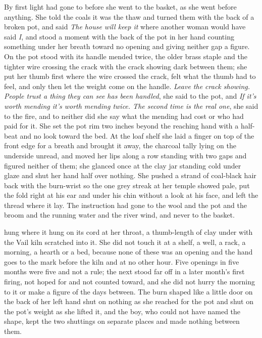 By first light  had gone to  before she went to the basket, as she went before anything. She told the coals it was the thaw and turned them with the back of a broken pot, and said \emph{The house will keep it} where another woman would have said \emph{I}, and stood a moment with the back of the pot in her hand counting something under her breath toward no opening and giving neither gap a figure. On  the pot stood with its handle mended twice, the older brass staple and the tighter wire crossing the crack with the crack showing dark between them; she put her thumb first where the wire crossed the crack, felt what the thumb had to feel, and only then let the weight come on the handle. \emph{Leave the crack showing. People trust a thing they can see has been handled}, she said to the pot, and \emph{If it's worth mending it's worth mending twice. The second time is the real one}, she said to the fire, and to neither did she say what the mending had cost or who had paid for it. She set the pot rim two inches beyond the reaching hand with a half-beat and no look toward the bed. At the loaf shelf she laid a finger on top of the front edge for a breath and brought it away, the charcoal tally lying on the underside unread, and moved her lips along a row standing with two gaps and figured neither of them; she glanced once at the clay jar standing cold under glaze and shut her hand half over nothing. She pushed a strand of coal-black hair back with the burn-wrist so the one grey streak at her temple showed pale, put the fold right at his ear and under his chin without a look at his face, and left the thread where it lay. The instruction had gone to the wool and the pot and the broom and the running water and the river wind, and never to the basket.

 hung where it hung on its cord at her throat, a thumb-length of clay under  with the Vail kiln scratched into it. She did not touch it at a shelf, a well, a rack, a morning, a hearth or a bed, because none of these was an opening and the hand goes to the mark before the kiln and at no other hour. Five openings in five months were five and not a rule; the next stood far off in a later month's first firing, not hoped for and not counted toward, and she did not hurry the morning to it or make a figure of the days between. The burn shaped like a little door on the back of her left hand shut on nothing as she reached for the pot and shut on the pot's weight as she lifted it, and the boy, who could not have named the shape, kept the two shuttings on separate places and made nothing between them.

